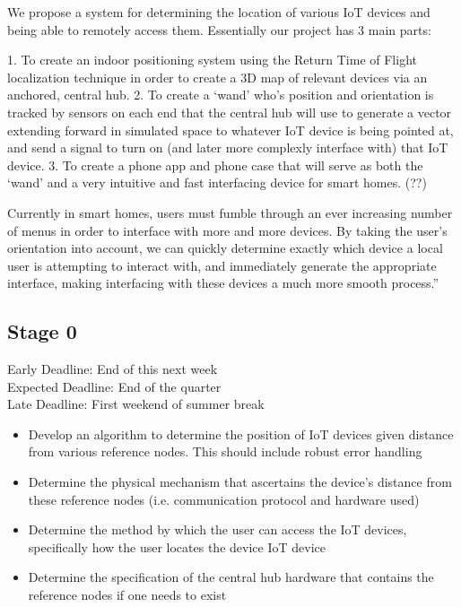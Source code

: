 \documentclass{article}
\begin{document}
We propose a system for determining the location of various IoT devices and being able to remotely access them.
Essentially our project has 3 main parts:

1. To create an indoor positioning system using the Return Time of Flight localization technique in order to create a 3D map of relevant devices via an anchored, central hub.
2. To create a ‘wand’ who’s position and orientation is tracked by sensors on each end that the central hub will use to generate a vector extending forward in simulated space to whatever IoT device is being pointed at, and send a signal to turn on (and later more complexly interface with) that IoT device.
3. To create a phone app and phone case that will serve as both the ‘wand’ and a very intuitive and fast interfacing device for smart homes. (??)

Currently in smart homes, users must fumble through an ever increasing number of menus in order to interface with more and more devices. By taking the user’s orientation into account, we can quickly determine exactly which device a local user is attempting to interact with, and immediately generate the appropriate interface, making interfacing with these devices a much more smooth process.”


\subsection{Stage 0}
Early Deadline: End of this next week \\
Expected Deadline: End of the quarter \\
Late Deadline: First weekend of summer break \\
\begin{itemize}
\item Develop an algorithm to determine the position of IoT devices given distance from various reference nodes. This should include robust error handling
\item Determine the physical mechanism that ascertains the device's distance from these reference nodes (i.e. communication protocol and hardware used)
\item Determine the method by which the user can access the IoT devices, specifically how the user locates the device IoT device
\item Determine the specification of the central hub hardware that contains the reference nodes if one needs to exist
\end{itemize}
\end{document}
